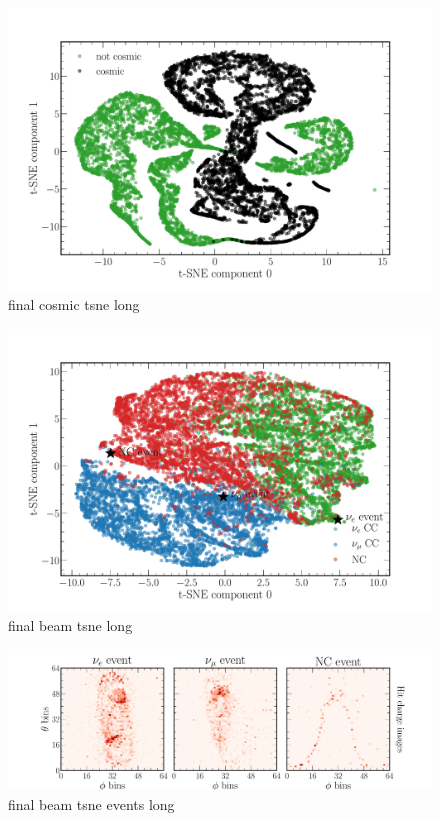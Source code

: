 \begin{figure} %
    \includegraphics[width=\textwidth]{diagrams/7-cvn/chipsnet/final_cosmic_tsne.pdf}
    \caption[final cosmic tsne short]
    {final cosmic tsne long}
    \label{fig:final_cosmic_tsne}
\end{figure}

\begin{figure} %
    \includegraphics[width=\textwidth]{diagrams/7-cvn/chipsnet/final_beam_tsne.pdf}
    \caption[final beam tsne short]
    {final beam tsne long}
    \label{fig:final_beam_tsne}
\end{figure}

\begin{figure} %
    \includegraphics[width=\textwidth]{diagrams/7-cvn/chipsnet/final_beam_tsne_events.pdf}
    \caption[final beam tsne events short]
    {final beam tsne events long}
    \label{fig:final_beam_tsne_events}
\end{figure}

